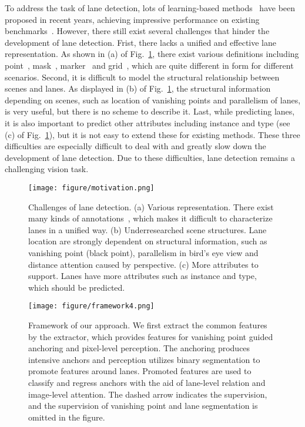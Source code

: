 \documentclass{article}
\begin{document}
To address the task of lane detection, lots of learning-based methods~\cite{pan2018spatial,qin2020ultra} have been proposed in recent years, achieving impressive performance on existing benchmarks~\cite{tusimple,pan2018spatial}. However, there still exist several challenges that hinder the development of lane detection. 
Frist, there lacks a unified and effective lane representation. As shown in (a) of Fig.~\ref{fig:motivation}, there exist various definitions including point~\cite{tusimple}, mask~\cite{pan2018spatial}, marker~\cite{yu2020bdd100k} and grid~\cite{lee2017vpgnet}, which are quite different in form for
different scenarios.
Second, it is difficult to model the structural relationship between scenes and lanes. As displayed in (b) of Fig.~\ref{fig:motivation}, the structural information depending on scenes, such as location of vanishing points and parallelism of lanes, is very useful, but there is no scheme to describe it.
Last, while predicting lanes, it is also important to predict other attributes including instance and type (see (c) of Fig.~\ref{fig:motivation}), but it is not easy to extend these for existing methods.
These three difficulties are especially difficult to deal with and greatly slow down the development of lane detection. Due to these difficulties, lane detection remains a challenging vision task.
\begin{figure}[t]
\centering
\texttt{[image: figure/motivation.png]}
\caption{Challenges of lane detection. (a) Various representation. There exist many kinds of annotations~\protect\cite{tusimple,pan2018spatial,yu2020bdd100k,lee2017vpgnet}, which makes it difficult to  characterize lanes in a unified way. (b) Underresearched scene structures. Lane location are strongly dependent on structural information, such as vanishing point (black point), parallelism in bird's eye view and distance attention caused by perspective. (c) More attributes to support. Lanes have more attributes such as instance and type, which should be predicted.}
\label{fig:motivation}
\end{figure}

\begin{figure*}[t]
\centering
\texttt{[image: figure/framework4.png]}
\caption{Framework of our approach. We first extract the common features by the extractor, which provides features for vanishing point guided anchoring and pixel-level perception. The anchoring produces intensive anchors and perception utilizes binary segmentation to promote features around lanes. Promoted features are used to classify and regress anchors with the aid of lane-level relation and image-level attention. The dashed arrow indicates the supervision, and the supervision of vanishing point and lane segmentation is omitted in the figure.}
\label{fig:framework}
\end{figure*}
\end{document}
